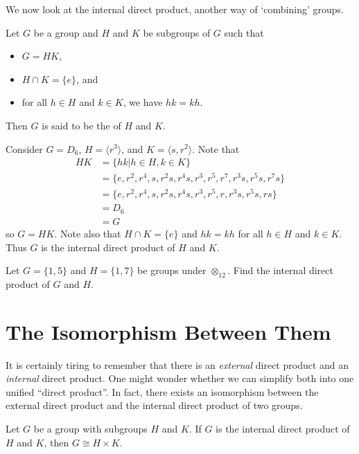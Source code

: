 We now look at the internal direct product, another way of `combining' groups.

\begin{definition}
    Let $G$ be a group and $H$ and $K$ be subgroups of $G$ such that
    \begin{itemize}
        \item $G = HK$,
        \item $H \cap K = \{e\}$, and
        \item for all $h \in H$ and $k \in K$, we have $hk = kh$.
    \end{itemize}
    Then $G$ is said to be the  of $H$ and $K$.
\end{definition}

\begin{example}
    Consider $G = D_6$, $H = \langle r^3 \rangle$, and $K = \langle s, r^2 \rangle$. Note that
    \begin{align*}
        HK &= \{hk \vert h \in H, k \in K\}\\
        &= \{e, r^2, r^4, s, r^2s, r^4s, r^3, r^5, r^7, r^3s, r^5s, r^7s\}\\
        &= \{e, r^2, r^4, s, r^2s, r^4s, r^3, r^5, r, r^3s, r^5s, rs\}\\
        &= D_6\\
        &= G
    \end{align*}
    so $G = HK$. Note also that $H \cap K = \{e\}$ and $hk = kh$ for all $h \in H$ and $k \in K$. Thus $G$ is the internal direct product of $H$ and $K$.
\end{example}

\begin{exercise}
    Let $G = \{1, 5\}$ and $H = \{1, 7\}$ be groups under $\otimes_{12}$. Find the internal direct product of $G$ and $H$.
\end{exercise}

\section{The Isomorphism Between Them}
It is certainly tiring to remember that there is an \textit{external} direct product and an \textit{internal} direct product. One might wonder whether we can simplify both into one unified ``direct product''. In fact, there exists an isomorphism between the external direct product and the internal direct product of two groups.

\begin{theorem}\label{thrm-direct-product-equivalence}
    Let $G$ be a group with subgroups $H$ and $K$. If $G$ is the internal direct product of $H$ and $K$, then $G \cong H \times K$.
\end{theorem}

